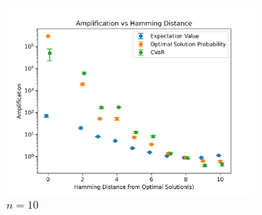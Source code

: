 \begin{figure}
\centering
\includegraphics[width=0.75\textwidth]{Figs/amplification_vs_hamming_distance.png}
\caption{$n=10$}
\label{fig:ham_amplification}
\end{figure}